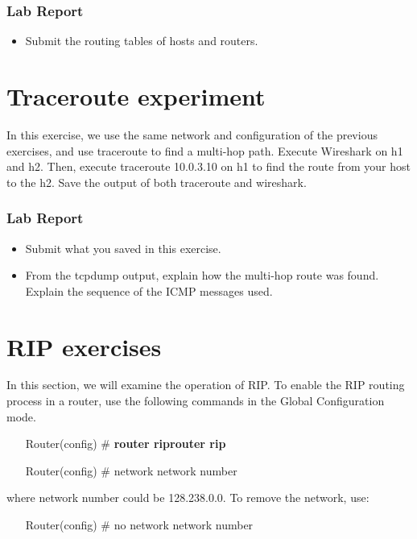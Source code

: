 \documentclass[10pt,a4paper]{article}
\numberwithin{equation}{section}
\numberwithin{figure}{section}
\numberwithin{table}{section}
\begin{document}
  \subsubsection*{ Lab Report}
\begin{itemize}
	\setlength{\itemindent}{0pt}
	\item Submit the routing tables of hosts and routers.
\end{itemize}

\section{Traceroute experiment}
In this exercise, we use the same network and configuration of the previous exercises, and use traceroute to find a multi-hop path.
Execute Wireshark on h1 and h2. Then, execute traceroute 10.0.3.10 on h1 to find the route from your host to the h2. Save the output of both traceroute and wireshark.

\subsubsection*{ Lab Report}
\begin{itemize}
	\setlength{\itemindent}{0pt}
	\item Submit what you saved in this exercise.
	\item From the tcpdump output, explain how the multi-hop route was found. Explain the sequence of the ICMP messages used.
\end{itemize}


\section{RIP exercises}
    In this section, we will examine the operation of RIP. To enable the RIP routing process in a router, use the following commands in the Global Configuration mode.\\
    \begin{itemize}
    	\setlength{\itemindent}{60pt}
    	\item [Router(config) \#] \textbf{router riprouter rip}
    	\item [Router(config) \#]  network network number
    \end{itemize}
     where network number could be 128.238.0.0. To remove the network, use:
     \begin{itemize}
     	\setlength{\itemindent}{60pt}
     	\item [Router(config) \#] no network network number
     \end{itemize}
 
\end{document}
